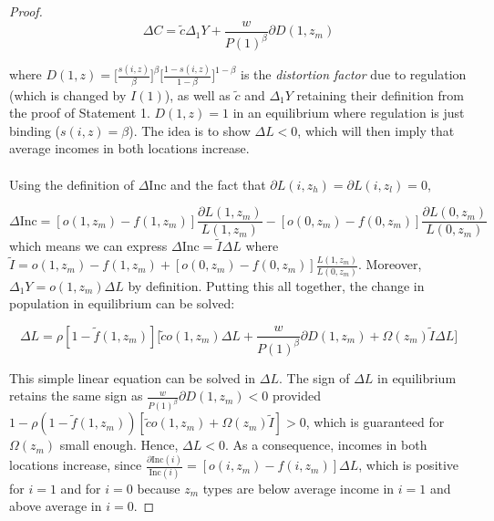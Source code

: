 \documentclass[12pt]{article}
\begin{document}
\begin{enumerate}
\begin{proof}
			\begin{equation*}
				\Delta C = \tilde{c}\Delta_{1}Y + \frac{w}{P(1)^{\beta}}\partial D(1, z_{m})
			\end{equation*}
			
			where $D(1, z) = \bigg[\frac{s(i, z)}{\beta}\bigg]^{\beta}\bigg[\frac{1 - s(i, z)}{1 - \beta}\bigg]^{1 - \beta} $ is the \textit{distortion factor} due to regulation (which is changed by $I(1)$), as well as $\tilde{c}$ and $\Delta_{1}Y$ retaining their definition from the proof of Statement 1. $D(1, z) = 1$ in an equilibrium where regulation is just binding ($s(i, z) = \beta$). The idea is to show $\Delta L < 0$, which will then imply that average incomes in both locations increase.
			
			\paragraph*{}
			 Using the definition of $\Delta \text{Inc}$ and the fact that $\partial L(i, z_{h}) = \partial L(i, z_{l}) = 0$,
			 
			 \begin{equation*}
			 	\Delta \text{Inc} = [o(1, z_{m}) - f(1, z_{m})]\frac{\partial L(1, z_{m})}{L(1, z_{m})} - [o(0, z_{m}) - f(0, z_{m})]\frac{\partial L(0, z_{m})}{L(0, z_{m})}
			 \end{equation*} 
			which means we can express $\Delta \text{Inc} = \tilde{I}\Delta L$ where $\tilde{I} = o(1, z_{m}) - f(1, z_{m}) + [o(0, z_{m}) - f(0, z_{m})]\frac{L(1, z_{m})}{L(0, z_{m})}$. Moreover, $\Delta_{1}Y = o(1, z_{m})\Delta L$ by definition. Putting this all together, the change in population in equilibrium can be solved:
			
			\begin{equation}\label{AppendixEq:EquilibriumPopMTypes}
					\Delta L = \rho[1 - \tilde{f}(1, z_{m})]\big[ \tilde{c}o(1, z_{m})\Delta L + \frac{w}{P(1)^{\beta}}\partial D(1, z_{m})  + \Omega(z_{m})\tilde{I}\Delta L \big]
			\end{equation}
			
			This simple linear equation can be solved in $\Delta L$. The sign of $\Delta L$ in equilibrium retains the same sign as $\frac{w}{P(1)^{\beta}}\partial D(1, z_{m}) < 0$ provided $1 - \rho(1-\tilde{f}(1, z_{m}))[\tilde{c}o(1, z_{m}) + \Omega(z_{m})\tilde{I}] > 0$, which is guaranteed for $\Omega(z_{m})$ small enough. Hence, $\Delta L < 0$. As a consequence, incomes in both locations increase, since $\frac{\partial \text{Inc}(i)}{\text{Inc}(i)} = [o(i, z_{m}) - f(i, z_{m})]\Delta L$, which is positive for $i = 1$ and for $i = 0$ because $z_{m}$ types are below average income in $i = 1$ and above average in $i = 0$.  
			

\end{proof}
\end{enumerate}
\end{document}
